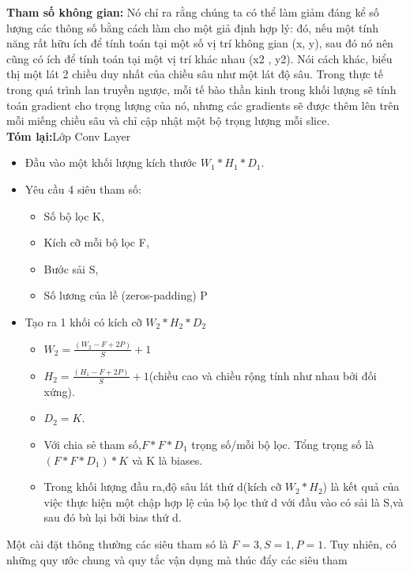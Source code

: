 \documentclass[a4paper,12pt]{report}
\begin{document}
\textbf{Tham số không gian:} Nó chỉ ra rằng chúng ta có thể làm giảm đáng kể số lượng các thông số bằng cách làm cho một giả định hợp lý: đó, nếu một tính năng rất hữu ích để tính toán tại một số vị trí không gian (x, y), sau đó nó nên cũng có ích để tính toán tại một vị trí khác nhau (x2 , y2). Nói cách khác, biểu thị một lát 2 chiều duy nhất của chiều sâu như một lát độ sâu. Trong thực tế trong quá trình lan truyền ngược, mỗi tế bào thần kinh trong khối lượng sẽ tính toán gradient cho trọng lượng của nó, nhưng các gradients sẽ được thêm lên trên mỗi miếng chiều sâu và chỉ cập nhật một bộ trọng lượng mỗi slice. \\
 
\textbf{Tóm lại:}Lớp Conv Layer
\begin{itemize}
\item Đầu vào một khối lượng kích thước $W_1*H_1*D_1$.
\item Yêu cầu 4 siêu tham số:
\begin{itemize}
\item Số bộ lọc K,
\item Kích cỡ mỗi bộ lọc F,
\item Bước sải S,
\item Số lương của lề (zeros-padding) P
\end{itemize}
\item Tạo ra 1 khối có kích cỡ $W_2*H_2*D_2$
\begin{itemize}
\item $W_2= \frac{(W_2 - F + 2P)}{S} + 1$
\item $H_2=\frac{(H_1 - F + 2P)}{S}+1$(chiều cao và chiều rộng tính như nhau bởi đối xứng).
\item $D_2 = K$.
\item Với chia sẻ tham số,$F*F*D_1$ trọng số/mỗi bộ lọc. Tổng trọng số là $(F*F*D_1)*K$ và K là biases.
\item Trong khối lượng đầu ra,độ sâu lát thứ d(kích cỡ $W_2*H_2$) là kết quả của việc thực hiện một chập hợp lệ của bộ lọc thứ d với đầu vào có sải là S,và sau đó bù lại bởi bias thứ d.
\end{itemize}
\end{itemize}
Một cài đặt thông thường các siêu tham só là $F = 3, S = 1, P= 1 $. Tuy nhiên, có những quy ước chung và quy tắc vận dụng mà thúc đẩy các siêu tham
\end{document}
